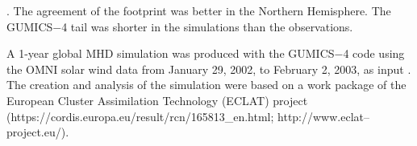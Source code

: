 \documentclass[b5paper,10pt]{article}
\begin{document}
\citep{tsyganenko95:_model_earth}. The agreement of the footprint was better in the Northern Hemisphere. The GUMICS$-$4 tail was shorter in the simulations than the observations. 

A 1-year global MHD simulation was produced with the GUMICS$-$4 code using the OMNI solar wind data from January 29, 2002, to February 2, 2003, as input \citep{facsko16:_one_earth}. The creation and analysis of the simulation were based on a work package of the European Cluster Assimilation Technology (ECLAT) project (https://cordis.europa.eu/result/rcn/165813\_en.html; http://www.eclat--project.eu/). %

\end{document}
